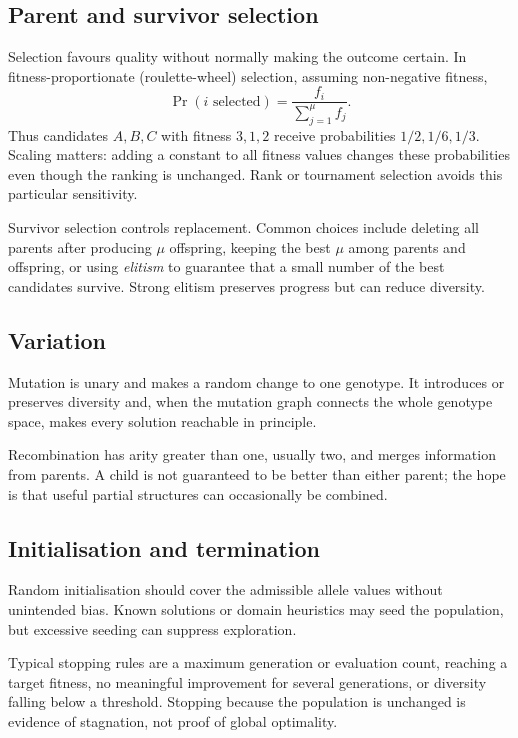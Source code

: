 \documentclass[11pt,a4paper]{article}
\begin{document}
\subsection{Parent and survivor selection}

Selection favours quality without normally making the outcome certain.  In
fitness-proportionate (roulette-wheel) selection, assuming non-negative
fitness,
\[
  \Pr(i\text{ selected})=\frac{f_i}{\sum_{j=1}^{\mu} f_j}.
\]
Thus candidates $A,B,C$ with fitness $3,1,2$ receive probabilities
$1/2,1/6,1/3$.  Scaling matters: adding a constant to all fitness values
changes these probabilities even though the ranking is unchanged.  Rank or
tournament selection avoids this particular sensitivity.

Survivor selection controls replacement.  Common choices include deleting
all parents after producing $\mu$ offspring, keeping the best $\mu$ among
parents and offspring, or using \emph{elitism} to guarantee that a small
number of the best candidates survive.  Strong elitism preserves progress but
can reduce diversity.

\subsection{Variation}

Mutation is unary and makes a random change to one genotype.  It introduces
or preserves diversity and, when the mutation graph connects the whole
genotype space, makes every solution reachable in principle.

Recombination has arity greater than one, usually two, and merges information
from parents.  A child is not guaranteed to be better than either parent; the
hope is that useful partial structures can occasionally be combined.

\subsection{Initialisation and termination}

Random initialisation should cover the admissible allele values without
unintended bias.  Known solutions or domain heuristics may seed the
population, but excessive seeding can suppress exploration.

Typical stopping rules are a maximum generation or evaluation count, reaching
a target fitness, no meaningful improvement for several generations, or
diversity falling below a threshold.  Stopping because the population is
unchanged is evidence of stagnation, not proof of global optimality.
\end{document}
